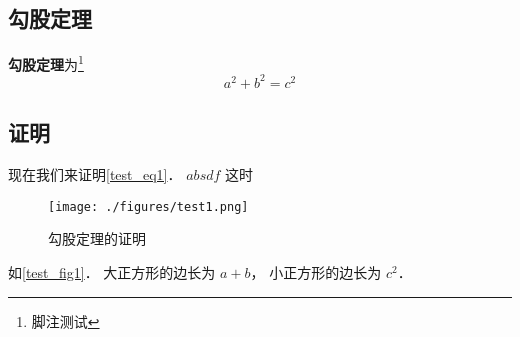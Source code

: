 

\subsection{勾股定理}
\textbf{勾股定理}为\footnote{脚注测试}
\begin{equation}\label{test_eq1}
a^2 + b^2 = c^2
\end{equation}

\subsection{证明}
现在我们来证明\autoref{test_eq1}． $absdf$ 这时

\begin{figure}[ht]
\centering
\texttt{[image: ./figures/test1.png]}
\caption{勾股定理的证明} \label{test_fig1}
\end{figure}

如\autoref{test_fig1}． 大正方形的边长为 $a + b$， 小正方形的边长为 $c^2$． 